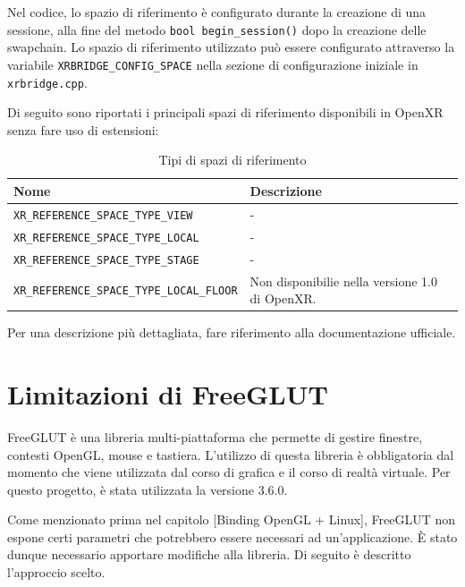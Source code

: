 \documentclass[twoside]{supsistudent}
\begin{document}
Nel codice, lo spazio di riferimento è configurato durante la creazione di una sessione, alla fine del metodo \texttt{bool begin\_session()} dopo la creazione delle swapchain. Lo spazio di riferimento utilizzato può essere configurato attraverso la variabile \texttt{XRBRIDGE\_CONFIG\_SPACE} nella sezione di configurazione iniziale in \texttt{xrbridge.cpp}.

Di seguito sono riportati i principali spazi di riferimento disponibili in OpenXR senza fare uso di estensioni:

\begin{table}[H]
  \caption{Tipi di spazi di riferimento}
  \begin{center}
    \begin{tabular}{ m{7cm} m{6cm} }
      Nome                                             & Descrizione \\
      \hline
      \texttt{XR\_REFERENCE\_SPACE\_TYPE\_VIEW}        & - \\
      \texttt{XR\_REFERENCE\_SPACE\_TYPE\_LOCAL}       & - \\
      \texttt{XR\_REFERENCE\_SPACE\_TYPE\_STAGE}       & - \\
      \texttt{XR\_REFERENCE\_SPACE\_TYPE\_LOCAL\_FLOOR} & Non disponibilie nella versione 1.0 di OpenXR. \\
    \end{tabular}
  \end{center}
\end{table}

Per una descrizione più dettagliata, fare riferimento alla documentazione ufficiale.

\section{Limitazioni di FreeGLUT}

FreeGLUT è una libreria multi-piattaforma che permette di gestire finestre, contesti OpenGL, mouse e tastiera. L'utilizzo di questa libreria è obbligatoria dal momento che viene utilizzata dal corso di grafica e il corso di realtà virtuale. Per questo progetto, è stata utilizzata la versione 3.6.0.


Come menzionato prima nel capitolo [Binding OpenGL + Linux], FreeGLUT non espone certi parametri che potrebbero essere necessari ad un'applicazione. È stato dunque necessario apportare modifiche alla libreria. Di seguito è descritto l'approccio scelto.
\end{document}

